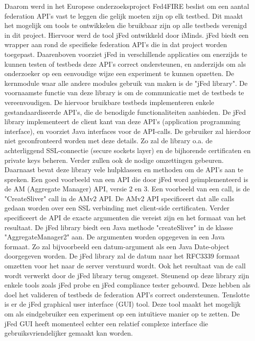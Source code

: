 Daarom werd in het Europese onderzoeksproject Fed4FIRE beslist om een aantal federation API's vast te leggen die gelijk moeten zijn op elk testbed. Dit maakt het mogelijk om tools te ontwikkelen die bruikbaar zijn op alle testbeds verenigd in dit project. Hiervoor werd de tool jFed ontwikkeld door iMinds. jFed biedt een wrapper aan rond de specifieke federation API's die in dat project worden toegepast. Daarenboven voorziet jFed in verschillende applicaties om enerzijds te kunnen testen of testbeds deze API's correct ondersteunen, en anderzijds om als onderzoeker op een eenvoudige wijze een experiment te kunnen opzetten. 
\npar
De kernmodule waar alle andere modules gebruik van maken is de "jFed library". De voornaamste functie van deze library is om de communicatie met de testbeds te vereenvoudigen. De hiervoor bruikbare testbeds implementeren enkele gestandaardiseerde API's, die de benodigde functionaliteiten aanbieden. De jFed library implementeert de client kant van deze API's (application programming interface), en voorziet Java interfaces voor de API-calls. De gebruiker zal hierdoor niet geconfronteerd worden met deze details. Zo zal de library o.a. de achterliggend SSL-connectie (secure sockets layer)  en de bijhorende certificaten en private keys beheren. Verder zullen ook de nodige omzettingen gebeuren. Daarnaast bevat deze library vele hulpklassen en methoden om de API's aan te spreken.
\npar
Een goed voorbeeld van een API die door jFed word ge\"implementeerd is de AM (Aggregate Manager)  API, versie 2 en 3.  Een voorbeeld van een call, is de "CreateSliver" call in de AMv2 API.
De AMv2 API specificeert dat alle calls gedaan worden over een SSL verbinding met client-side certificaten. Verder specificeert de API de exacte argumenten die vereist zijn en het formaat van het resultaat. De jFed library biedt een Java methode "createSliver" in de klasse "AggregateManager2" aan. De argumenten worden opgegeven in een Java formaat. Zo zal bijvoorbeeld een datum-argument als een Java Date-object doorgegeven worden.  De jFed library zal de datum naar het RFC3339 formaat omzetten voor het naar de server verstuurd wordt. Ook het resultaat van de call wordt verwerkt door de jFed library terug omgezet.
\npar
Steunend op deze library zijn enkele tools zoals jFed probe en jFed compliance tester gebouwd. Deze hebben als doel het valideren of testbeds de federation API's correct ondersteunen. Tenslotte is er de jFed graphical user interface (GUI)  tool. Deze tool maakt het mogelijk om als eindgebruiker een experiment op een intu\"itieve manier op te zetten. De jFed GUI heeft momenteel echter een relatief complexe interface die gebruiksvriendelijker gemaakt kan worden. 

